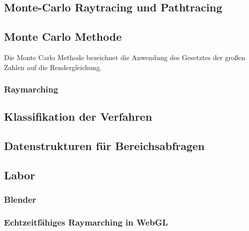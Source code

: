 \subsection{Monte-Carlo Raytracing und Pathtracing}


\begin{figure}[H]\centering
    \hspace*{0.1\textwidth}
\end{figure}


\subsection{Monte Carlo Methode}
Die Monte Carlo Methode bezeichnet die Anwendung des  Gesetztes der großen Zahlen auf die Rendergleichung.


\subsubsection{Raymarching}
\subsection{Klassifikation der Verfahren}

\subsection{Datenstrukturen für Bereichsabfragen}


\subsection{Labor}
\subsubsection{Blender}
\subsubsection{Echtzeitfähiges Raymarching in WebGL}

